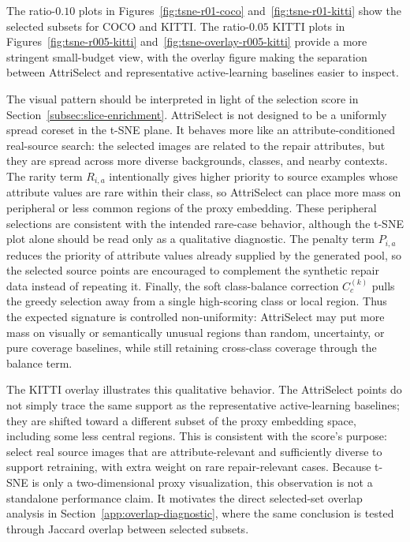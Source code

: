 \documentclass{article}
\newcommand{\model}{AttriSelect\xspace}
\begin{document}
The ratio-$0.10$ plots in Figures~\ref{fig:tsne-r01-coco} and~\ref{fig:tsne-r01-kitti} show the selected subsets for COCO and KITTI. The ratio-$0.05$ KITTI plots in Figures~\ref{fig:tsne-r005-kitti} and~\ref{fig:tsne-overlay-r005-kitti} provide a more stringent small-budget view, with the overlay figure making the separation between \model and representative active-learning baselines easier to inspect.

The visual pattern should be interpreted in light of the selection score in Section~\ref{subsec:slice-enrichment}. \model is not designed to be a uniformly spread coreset in the t-SNE plane. It behaves more like an attribute-conditioned real-source search: the selected images are related to the repair attributes, but they are spread across more diverse backgrounds, classes, and nearby contexts. The rarity term $R_{i,a}$ intentionally gives higher priority to source examples whose attribute values are rare within their class, so \model can place more mass on peripheral or less common regions of the proxy embedding. These peripheral selections are consistent with the intended rare-case behavior, although the t-SNE plot alone should be read only as a qualitative diagnostic. The penalty term $P_{i,a}$ reduces the priority of attribute values already supplied by the generated pool, so the selected source points are encouraged to complement the synthetic repair data instead of repeating it. Finally, the soft class-balance correction $C_c^{(k)}$ pulls the greedy selection away from a single high-scoring class or local region. Thus the expected signature is controlled non-uniformity: \model may put more mass on visually or semantically unusual regions than random, uncertainty, or pure coverage baselines, while still retaining cross-class coverage through the balance term.

The KITTI overlay illustrates this qualitative behavior. The \model points do not simply trace the same support as the representative active-learning baselines; they are shifted toward a different subset of the proxy embedding space, including some less central regions. This is consistent with the score's purpose: select real source images that are attribute-relevant and sufficiently diverse to support retraining, with extra weight on rare repair-relevant cases. Because t-SNE is only a two-dimensional proxy visualization, this observation is not a standalone performance claim. It motivates the direct selected-set overlap analysis in Section~\ref{app:overlap-diagnostic}, where the same conclusion is tested through Jaccard overlap between selected subsets.
\end{document}
